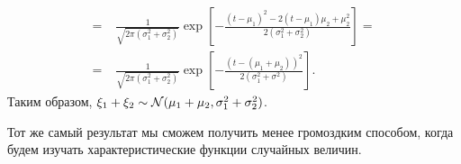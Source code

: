 \documentclass[../main.tex]{subfiles}
\begin{document}
\begin{exmpl}
\begin{align*}
  =\;&\frac{1}{\sqrt{2\pi (\sigma_1^{2}+\sigma_2^{2})}} \exp \left[ -\frac{(t-\mu_1)^{2} - 2(t-\mu_1)\mu_2 + \mu_2^{2}}{2(\sigma_1^{2}+\sigma_2^{2})} \right] = \\
  =\;&\frac{1}{\sqrt{2\pi (\sigma_1^{2}+\sigma_2^{2})}} \exp \left[ -\frac{(t - (\mu_1+\mu_2))^{2}}{2 (\sigma_1^{2}+\sigma^{2})} \right].
 \end{align*} Таким образом, $ \xi_1 + \xi_2 \sim \mathcal N(\mu_1 + \mu_2, \sigma_1^{2} + \sigma_2^{2}) $.

 Тот же самый результат мы сможем получить менее громоздким способом, когда будем изучать характеристические функции случайных величин.
\end{exmpl}
\end{document}
